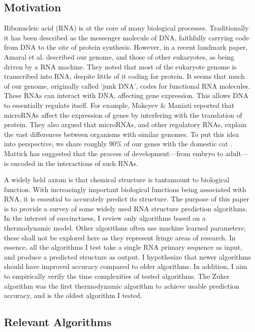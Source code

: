 \documentclass[12pt, a4paper]{article}
\begin{document}
\subsection{Motivation}
Ribonucleic acid (RNA) is at the core of many biological processes. Traditionally it has been described as the messenger molecule of DNA, faithfully carrying code from DNA to the site of protein synthesis. However, in a recent landmark paper, Amaral et al. \cite{amaral2008eukaryotic} described our genome, and those of other eukaryotes, as being driven by a RNA machine. They noted that most of the eukaryote genome is transcribed into RNA, despite little of it coding for protein. It seems that much of our genome, originally called `junk DNA', codes for functional RNA molecules. These RNAs can interact with DNA, affecting gene expression. This allows DNA to essentially regulate itself. For example, Makeyev \& Maniati \cite{makeyev2008multilevel} reported that microRNAs affect the expression of genes by interfering with the translation of protein. They also argued that microRNAs, and other regulatory RNAs, explain the vast differences between organisms with similar genomes. To put this idea into perspective, we share roughly 90\% of our genes with the domestic cat \cite{pontius2007initial}. Mattick \cite{mattick2007new} has suggested that the process of development---from embryo to adult---is encoded in the interactions of such RNAs.

A widely held axiom is that chemical structure is tantamount to biological function. With increasingly important biological functions being associated with RNA, it is essential to accurately predict its structure. The purpose of this paper is to provide a survey of some widely used RNA structure prediction algorithms. In the interest of succinctness, I review only algorithms based on a thermodynamic model. Other algorithms often use machine learned parameters; these shall not be explored here as they represent fringe areas of research. In essence, all the algorithms I test take a single RNA primary sequence as input, and produce a predicted structure as output. I hypothesize that newer algorithms should have improved accuracy compared to older algorithms. In addition, I aim to empirically verify the time complexities of tested algorithms. The Zuker algorithm was the first thermodynamic algorithm to achieve usable prediction accuracy, and is the oldest algorithm I tested.

\subsection{Relevant Algorithms}
\end{document}
